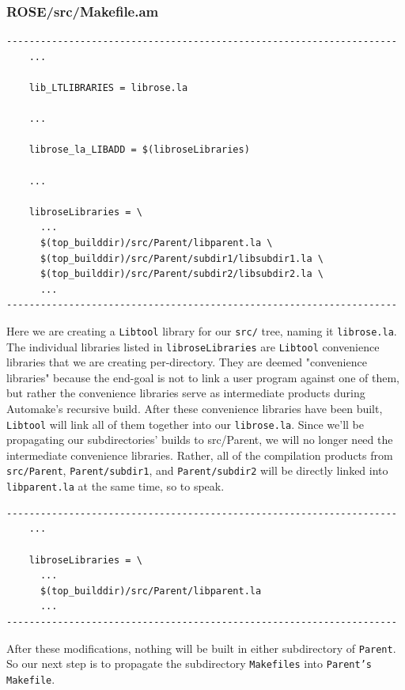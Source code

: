 \subsubsection{ROSE/src/Makefile.am}
    \begin{verbatim}
---------------------------------------------------------------------
    ...
  
    lib_LTLIBRARIES = librose.la

    ...
  
    librose_la_LIBADD = $(libroseLibraries)

    ...

    libroseLibraries = \
      ...
      $(top_builddir)/src/Parent/libparent.la \
      $(top_builddir)/src/Parent/subdir1/libsubdir1.la \
      $(top_builddir)/src/Parent/subdir2/libsubdir2.la \
      ...
---------------------------------------------------------------------
    \end{verbatim}
Here we are creating a \texttt{Libtool} library for our \texttt{src/} tree, naming it 
\texttt{librose.la}. The individual libraries listed in \texttt{libroseLibraries} are
\texttt{Libtool} convenience libraries that we are creating per-directory. They are deemed
"convenience libraries" because the end-goal is not to link a user program against one
of them, but rather the convenience libraries serve as intermediate products during
Automake's recursive build. After these convenience libraries have been built, \texttt{Libtool}
will link all of them together into our \texttt{librose.la}.
\newline\newline
Since we'll be propagating our subdirectories' builds
to src/Parent, we will no longer need the intermediate convenience libraries. Rather, all of
the compilation products from \texttt{src/Parent}, \texttt{Parent/subdir1}, and \texttt{Parent/subdir2}
will be directly linked into \texttt{libparent.la} at the same time, so to speak.

    \begin{verbatim}
---------------------------------------------------------------------
    ...
  
    libroseLibraries = \
      ...
      $(top_builddir)/src/Parent/libparent.la
      ...
---------------------------------------------------------------------
    \end{verbatim}
After these modifications, nothing will be built in either subdirectory of \texttt{Parent}. So our
next step is to propagate the subdirectory \texttt{Makefiles} into \texttt{Parent's Makefile}.


